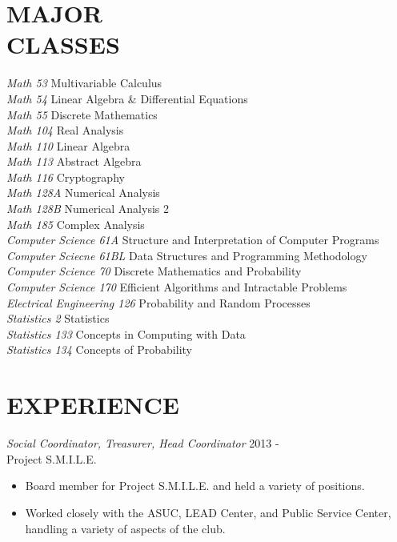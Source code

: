 \documentclass[margin]{res}
\begin{document}
\begin{resume}
\section{MAJOR \\ CLASSES}             
                {\sl Math 53} Multivariable Calculus\\
                {\sl Math 54} Linear Algebra \& Differential Equations\\
								{\sl Math 55} Discrete Mathematics\\
                {\sl Math 104} Real Analysis\\
								{\sl Math 110} Linear Algebra\\
                {\sl Math 113} Abstract Algebra\\
				{\sl Math 116} Cryptography\\
				{\sl Math 128A} Numerical Analysis\\
                {\sl Math 128B} Numerical Analysis 2\\
                {\sl Math 185} Complex Analysis\\
                {\sl Computer Science 61A} Structure and Interpretation of Computer Programs\\
								{\sl Computer Sciecne 61BL} Data Structures and Programming Methodology\\
								{\sl Computer Science 70} Discrete Mathematics and Probability\\
                {\sl Computer Science 170} Efficient Algorithms and Intractable Problems\\
		{\sl Electrical Engineering 126} Probability and Random Processes\\
                {\sl Statistics 2} Statistics\\
                {\sl Statistics 133} Concepts in Computing with Data\\
                {\sl Statistics 134} Concepts of Probability\\
								
\section{EXPERIENCE} {\sl Social Coordinator, Treasurer, Head Coordinator} \hfill            2013 -\\
                Project S.M.I.L.E.
                 \begin{itemize}  \itemsep -2pt %
                 \item Board member for Project S.M.I.L.E. and
                                held a variety of positions.
                \item Worked closely with the ASUC, LEAD Center, and Public Service Center, handling a variety of aspects of the club.
                 \end{itemize}


\end{resume}
\end{document}
